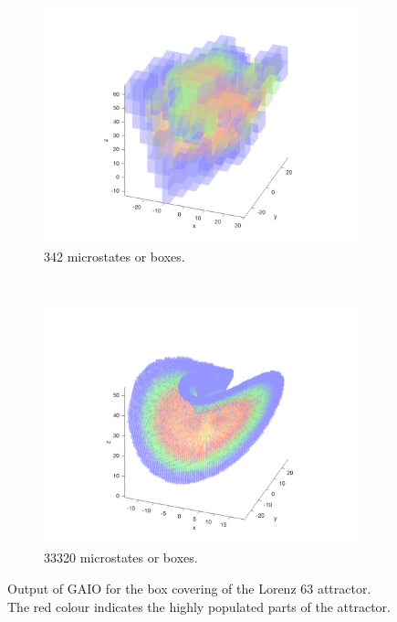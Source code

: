 \begin{figure}[H]
	\centering
	\begin{subfigure}[b]{0.4\textwidth}
		\includegraphics[width=\textwidth]{l63n10.png}
		\caption{342 microstates or boxes.}
		\label{l63n10}
	\end{subfigure}
	~ %
	\begin{subfigure}[b]{0.4\textwidth}
		\includegraphics[width=\textwidth]{l63n21.png}
		\caption{33320 microstates or boxes.}
	\end{subfigure}
	\caption{Output of GAIO for the box covering of the Lorenz 63 attractor. The red colour indicates the highly populated parts of the attractor.}
\end{figure}

